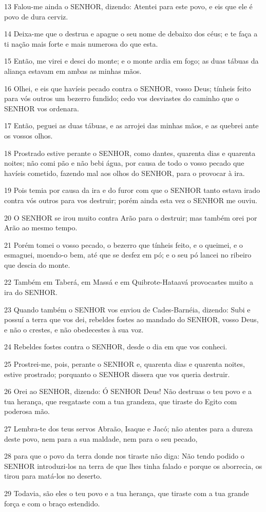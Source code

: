\par 13 Falou-me ainda o SENHOR, dizendo: Atentei para este povo, e eis que ele é povo de dura cerviz.
\par 14 Deixa-me que o destrua e apague o seu nome de debaixo dos céus; e te faça a ti nação mais forte e mais numerosa do que esta.
\par 15 Então, me virei e desci do monte; e o monte ardia em fogo; as duas tábuas da aliança estavam em ambas as minhas mãos.
\par 16 Olhei, e eis que havíeis pecado contra o SENHOR, vosso Deus; tínheis feito para vós outros um bezerro fundido; cedo vos desviastes do caminho que o SENHOR vos ordenara.
\par 17 Então, peguei as duas tábuas, e as arrojei das minhas mãos, e as quebrei ante os vossos olhos.
\par 18 Prostrado estive perante o SENHOR, como dantes, quarenta dias e quarenta noites; não comi pão e não bebi água, por causa de todo o vosso pecado que havíeis cometido, fazendo mal aos olhos do SENHOR, para o provocar à ira.
\par 19 Pois temia por causa da ira e do furor com que o SENHOR tanto estava irado contra vós outros para vos destruir; porém ainda esta vez o SENHOR me ouviu.
\par 20 O SENHOR se irou muito contra Arão para o destruir; mas também orei por Arão ao mesmo tempo.
\par 21 Porém tomei o vosso pecado, o bezerro que tínheis feito, e o queimei, e o esmaguei, moendo-o bem, até que se desfez em pó; e o seu pó lancei no ribeiro que descia do monte.
\par 22 Também em Taberá, em Massá e em Quibrote-Hataavá provocastes muito a ira do SENHOR.
\par 23 Quando também o SENHOR vos enviou de Cades-Barnéia, dizendo: Subi e possuí a terra que vos dei, rebeldes fostes ao mandado do SENHOR, vosso Deus, e não o crestes, e não obedecestes à sua voz.
\par 24 Rebeldes fostes contra o SENHOR, desde o dia em que vos conheci.
\par 25 Prostrei-me, pois, perante o SENHOR e, quarenta dias e quarenta noites, estive prostrado; porquanto o SENHOR dissera que vos queria destruir.
\par 26 Orei ao SENHOR, dizendo: Ó SENHOR Deus! Não destruas o teu povo e a tua herança, que resgataste com a tua grandeza, que tiraste do Egito com poderosa mão.
\par 27 Lembra-te dos teus servos Abraão, Isaque e Jacó; não atentes para a dureza deste povo, nem para a sua maldade, nem para o seu pecado,
\par 28 para que o povo da terra donde nos tiraste não diga: Não tendo podido o SENHOR introduzi-los na terra de que lhes tinha falado e porque os aborrecia, os tirou para matá-los no deserto.
\par 29 Todavia, são eles o teu povo e a tua herança, que tiraste com a tua grande força e com o braço estendido.

